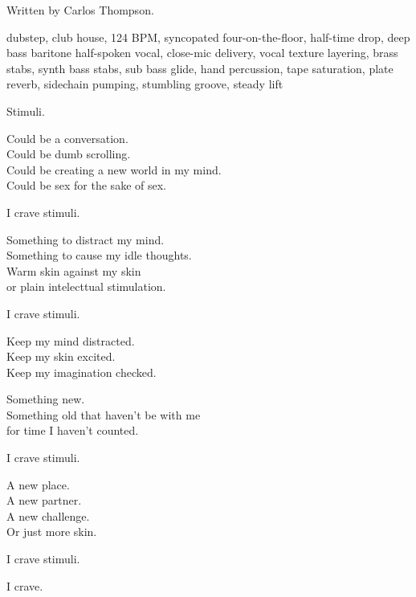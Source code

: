 
\label{sec:stimuli}
\begin{notes}
Written by Carlos Thompson.
\end{notes}
\begin{style}
dubstep, club house, 124 BPM, syncopated four-on-the-floor, half-time drop, deep bass baritone half-spoken vocal, close-mic delivery, vocal texture layering, brass stabs, synth bass stabs, sub bass glide, hand percussion, tape saturation, plate reverb, sidechain pumping, stumbling groove, steady lift
\end{style}
\begin{lyrics}
Stimuli.

Could be a conversation.\\
Could be dumb scrolling.\\
Could be creating a new world in my mind.\\
Could be sex for the sake of sex.

I crave stimuli.

Something to distract my mind.\\
Something to cause my idle thoughts.\\
Warm skin against my skin\\
or plain intelecttual stimulation.

I crave stimuli.

Keep my mind distracted.\\
Keep my skin excited.\\
Keep my imagination checked.

Something new.\\
Something old that haven't be with me\\
for time I haven't counted.

I crave stimuli.

A new place.\\
A new partner.\\
A new challenge.\\
Or just more skin.

I crave stimuli.

I crave.
\end{lyrics}

